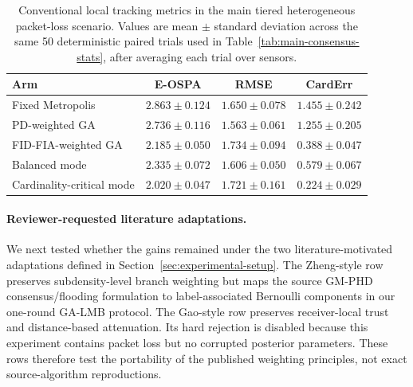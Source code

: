 \begin{table}[t]
  \centering
  \caption{Conventional local tracking metrics in the main tiered heterogeneous packet-loss scenario. Values are mean $\pm$ standard deviation across the same 50 deterministic paired trials used in Table~\ref{tab:main-consensus-stats}, after averaging each trial over sensors.}
  \label{tab:main-local}
  \begin{tabular}{lccc}
    \toprule
    Arm & E-OSPA & RMSE & CardErr \\
    \midrule
    Fixed Metropolis & $2.863 \pm 0.124$ & $1.650 \pm 0.078$ & $1.455 \pm 0.242$ \\
    PD-weighted GA & $2.736 \pm 0.116$ & $\mathbf{1.563} \pm 0.061$ & $1.255 \pm 0.205$ \\
    FID-FIA-weighted GA & $2.185 \pm 0.050$ & $1.734 \pm 0.094$ & $0.388 \pm 0.047$ \\
    Balanced mode & $2.335 \pm 0.072$ & $1.606 \pm 0.050$ & $0.579 \pm 0.067$ \\
    Cardinality-critical mode & $\mathbf{2.020} \pm 0.047$ & $1.721 \pm 0.161$ & $\mathbf{0.224} \pm 0.029$ \\
    \bottomrule
  \end{tabular}
\end{table}

\paragraph{Reviewer-requested literature adaptations.}
We next tested whether the gains remained under the two literature-motivated adaptations defined in Section~\ref{sec:experimental-setup}. The Zheng-style row preserves subdensity-level branch weighting but maps the source GM-PHD consensus/flooding formulation to label-associated Bernoulli components in our one-round GA-LMB protocol. The Gao-style row preserves receiver-local trust and distance-based attenuation. Its hard rejection is disabled because this experiment contains packet loss but no corrupted posterior parameters. These rows therefore test the portability of the published weighting principles, not exact source-algorithm reproductions.

